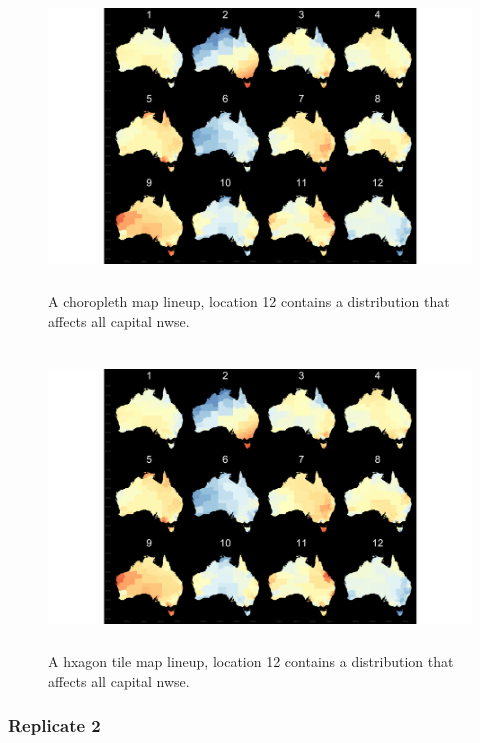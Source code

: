 \documentclass{monashthesis}
\begin{document}
\begin{figure}[H]
\centering
\includegraphics[height=8cm]{lineups/nwse-geo2-1.pdf}
\caption{\label{fig:nwse-geo2}A choropleth map lineup, location 12 contains a distribution that affects all capital nwse.}
\end{figure}

\begin{figure}[H]
\centering
\includegraphics[height=8cm]{lineups/nwse-hex2-1.pdf}
\caption{\label{fig:nwse-hex2}A hxagon tile map lineup, location 12 contains a distribution that affects all capital nwse.}
\end{figure}

\hypertarget{replicate-2-2}{%
\subsubsection{Replicate 2}\label{replicate-2-2}}
\end{document}
